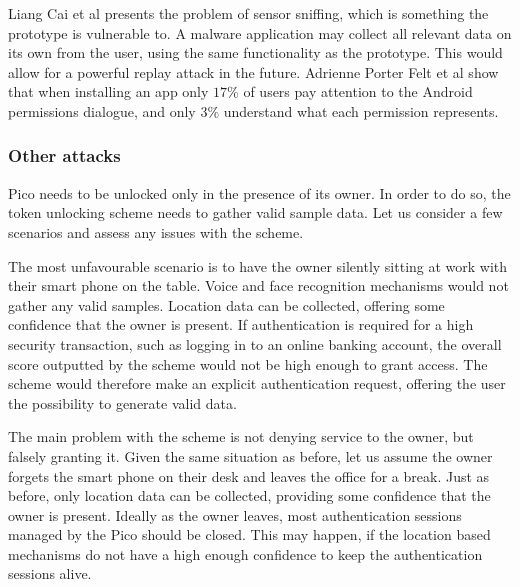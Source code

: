 Liang Cai et al \cite{cai2009defending} presents the problem of sensor sniffing, which is something the prototype is vulnerable to. A malware application may collect all relevant data on its own from the user, using the same functionality as the prototype. This would allow for a powerful replay attack in the future. Adrienne Porter Felt et al \cite{felt2012android} show that when installing an app only $17\%$ of users pay attention to the Android permissions dialogue, and only $3\%$ understand what each permission represents.

\subsubsection*{Other attacks}
Pico needs to be unlocked only in the presence of its owner. In order to do so, the token unlocking scheme needs to gather valid sample data. Let us consider a few scenarios and assess any issues with the scheme.
 
The most unfavourable scenario is to have the owner silently sitting at work with their smart phone on the table. Voice and face recognition mechanisms would not gather any valid samples. Location data can be collected, offering some confidence that the owner is present. If authentication is required for a high security transaction, such as logging in to an online banking account, the overall score outputted by the scheme would not be high enough to grant access. The scheme would therefore make an explicit authentication request, offering the user the possibility to generate valid data.

The main problem with the scheme is not denying service to the owner, but falsely granting it. Given the same situation as before, let us assume the owner forgets the smart phone on their desk and leaves the office for a break. Just as before, only location data can be collected, providing some confidence that the owner is present. Ideally as the owner leaves, most authentication sessions managed by the Pico should be closed. This may happen, if the location based mechanisms do not have a high enough confidence to keep the authentication sessions alive. 

